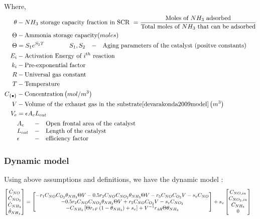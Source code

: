 Where,
\begin{align*}
    \theta &- NH_3 \text{ storage capacity fraction in SCR } = \frac{\text{Moles of $NH_3$ adsorbed}}{\text{Total moles of $NH_3$ that can be adsorbed}}\\
    \Theta &- \text{Ammonia storage capacity} (moles)\\
    \Theta &= S_1 e^{S_2 T} \qquad \qquad \begin{matrix*}[l]
                S_1, S_2 &-& \text{Aging parameters of the catalyst (positve constants)}
            \end{matrix*}\\
    E_i &- \text{Activation Energy of $i^{th}$ reaction}\\
    k_i &- \text{Pre-exponential factor}\\
    R &- \text{Universal gas constant}\\
    T &- \text{Temperature}\\
    C_{\{\bullet\}} &- \text{Concentration} \lr{mol/m^3}\\
    V &- \text{Volume of the exhaust gas in the substrate\cite{devarakonda2009model}} \lr{m^3}\\
    V_e &= \epsilon A_c L_{cat}\\
        &\begin{matrix*}[l]
        A_c &-& \text{Open frontal area of the catalyst}\\
        L_{cat} &-& \text{Length of the catalyst}\\
        \epsilon &-& \text{efficiency factor}
        \end{matrix*}\\
\end{align*}

\subsubsection{Dynamic model}
Using above assumptions and definitions, we have the dynamic model \cite{nova2014urea}:
\begin{align*}
    \begin{bmatrix} \dot C_{NO} \\
        \dot C_{NO_2}\\
        \dot C_{NH_3}\\
        \dot \theta_{NH_3}\\
         \end{bmatrix} &=
    \begin{bmatrix} 
        -r_1 C_{NO} C_{O_2} \theta_{NH_3} \Theta V
        - 0.5 r_2 C_{NO} C_{NO_2} \theta_{NH_3} \Theta V
        -r_5 C_{NO} C_{O_2} V
        -s_v C_{NO}\\
        -0.5 r_2 C_{NO} C_{NO_2} \theta_{NH_3} \Theta V
        + r_5 C_{NO} C_{O_2} V
        -s_v C_{NO_2}\\
        -C_{NH_3} \left[ \Theta r_{rF} \left( 1 - \theta_{NH_3} \right) + s_v \right] + V^{-1} r_{4R} \Theta \theta_{NH_3}\\
     \end{bmatrix}
    + s_v \begin{bmatrix} C_{NO, in} \\ C_{NO_2, in} \\ C_{NH_3} \\ 0 \end{bmatrix}
\end{align*}
